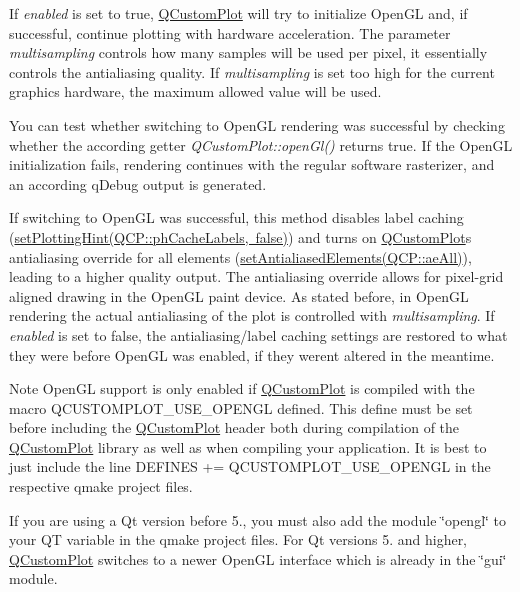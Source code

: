 If {\itshape enabled} is set to true, \mbox{\hyperlink{class_q_custom_plot}{Q\+Custom\+Plot}} will try to initialize Open\+GL and, if successful, continue plotting with hardware acceleration. The parameter {\itshape multisampling} controls how many samples will be used per pixel, it essentially controls the antialiasing quality. If {\itshape multisampling} is set too high for the current graphics hardware, the maximum allowed value will be used.

You can test whether switching to Open\+GL rendering was successful by checking whether the according getter {\itshape Q\+Custom\+Plot\+::open\+Gl()} returns true. If the Open\+GL initialization fails, rendering continues with the regular software rasterizer, and an according q\+Debug output is generated.

If switching to Open\+GL was successful, this method disables label caching (\mbox{\hyperlink{class_q_custom_plot_a3b7c97bb6c16464e9e15190c07abe9a9}{set\+Plotting\+Hint(Q\+CP\+:\+:ph\+Cache\+Labels, false)}}) and turns on \mbox{\hyperlink{class_q_custom_plot}{Q\+Custom\+Plot}}\textquotesingle{}s antialiasing override for all elements (\mbox{\hyperlink{class_q_custom_plot_af6f91e5eab1be85f67c556e98c3745e8}{set\+Antialiased\+Elements(Q\+CP\+:\+:ae\+All)}}), leading to a higher quality output. The antialiasing override allows for pixel-\/grid aligned drawing in the Open\+GL paint device. As stated before, in Open\+GL rendering the actual antialiasing of the plot is controlled with {\itshape multisampling}. If {\itshape enabled} is set to false, the antialiasing/label caching settings are restored to what they were before Open\+GL was enabled, if they weren\textquotesingle{}t altered in the meantime.

\begin{DoxyNote}{Note}
Open\+GL support is only enabled if \mbox{\hyperlink{class_q_custom_plot}{Q\+Custom\+Plot}} is compiled with the macro {\ttfamily Q\+C\+U\+S\+T\+O\+M\+P\+L\+O\+T\+\_\+\+U\+S\+E\+\_\+\+O\+P\+E\+N\+GL} defined. This define must be set before including the \mbox{\hyperlink{class_q_custom_plot}{Q\+Custom\+Plot}} header both during compilation of the \mbox{\hyperlink{class_q_custom_plot}{Q\+Custom\+Plot}} library as well as when compiling your application. It is best to just include the line {\ttfamily D\+E\+F\+I\+N\+ES += Q\+C\+U\+S\+T\+O\+M\+P\+L\+O\+T\+\_\+\+U\+S\+E\+\_\+\+O\+P\+E\+N\+GL} in the respective qmake project files. 

If you are using a Qt version before 5., you must also add the module \char`\"{}opengl\char`\"{} to your {\ttfamily QT} variable in the qmake project files. For Qt versions 5. and higher, \mbox{\hyperlink{class_q_custom_plot}{Q\+Custom\+Plot}} switches to a newer Open\+GL interface which is already in the \char`\"{}gui\char`\"{} module. 
\end{DoxyNote}
\mbox{\label{class_q_custom_plot_a3b7c97bb6c16464e9e15190c07abe9a9}} 
